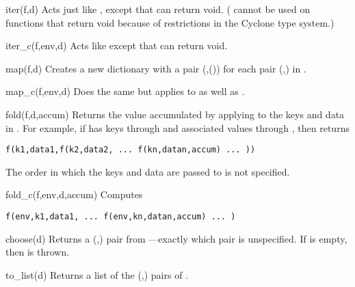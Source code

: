 \begin{defun}{iter}{(f,d)}
Acts just like , except that  can return void.
( cannot be used on functions that return void because of
restrictions in the Cyclone type system.)
\end{defun}

\begin{defun}{iter_c}{(f,env,d)}
Acts like  except that  can return void.
\end{defun}

\begin{defun}{map}{(f,d)}
Creates a new dictionary with a pair (,()) for
each pair (,) in .
\end{defun}

\begin{defun}{map_c}{(f,env,d)}
Does the same but applies  to  as well as .
\end{defun}


\begin{defun}{fold}{(f,d,accum)}
Returns the value accumulated by applying  to the keys and data
in .  For example, if  has keys  through 
and associated values  through , then 
returns

\begin{verbatim}
f(k1,data1,f(k2,data2, ... f(kn,datan,accum) ... ))
\end{verbatim}

\noindent The order in which the keys and data are passed to  is
not specified.
\end{defun}

\begin{defun}{fold_c}{(f,env,d,accum)}
Computes

\begin{verbatim}
f(env,k1,data1, ... f(env,kn,datan,accum) ... )
\end{verbatim}
\end{defun}

\begin{defun}{choose}{(d)}
Returns a (,) pair from ---exactly which pair
is unspecified.  If  is empty, then  is thrown.
\end{defun}

\begin{defun}{to_list}{(d)}
Returns a list of the (,) pairs of .
\end{defun}

